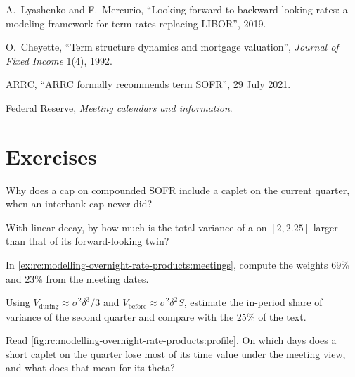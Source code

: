 \begin{omsources}
\item A.\ Lyashenko and F.\ Mercurio, ``Looking forward to backward-looking rates:
a modeling framework for term rates replacing LIBOR'', 2019.
\item O.\ Cheyette, ``Term structure dynamics and mortgage valuation'', \emph{Journal
of Fixed Income} 1(4), 1992.
\item ARRC, ``ARRC formally recommends term SOFR'', 29 July 2021.
\item Federal Reserve, \emph{Meeting calendars and information}.
\end{omsources}

\section{Exercises}

\begin{exercise}[$\star$]\label{exo:rc:modelling-overnight-rate-products:1}
Why does a cap on compounded SOFR include a caplet on the current quarter, when an
interbank cap never did?
\end{exercise}

\begin{exercise}[$\star$]\label{exo:rc:modelling-overnight-rate-products:2}
With linear decay, by how much is the total variance of a 
on $[2,2.25]$ larger than that of its forward-looking twin?
\end{exercise}

\begin{exercise}[$\star$]\label{exo:rc:modelling-overnight-rate-products:3}
In \cref{ex:rc:modelling-overnight-rate-products:meetings}, compute the weights
69\% and 23\% from the meeting dates.
\end{exercise}

\begin{exercise}[$\star\star$]\label{exo:rc:modelling-overnight-rate-products:4}
Using $V_{\text{during}}\approx\sigma^2\delta^3/3$ and $V_{\text{before}}\approx\sigma^2\delta^2S$,
estimate the in-period share of variance of the second quarter and compare with the
25\% of the text.
\end{exercise}

\begin{exercise}[$\star\star$]\label{exo:rc:modelling-overnight-rate-products:5}
Read \cref{fig:rc:modelling-overnight-rate-products:profile}. On which days does a
short caplet on the quarter lose most of its time value under the meeting view,
and what does that mean for its theta?
\end{exercise}

